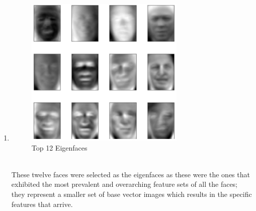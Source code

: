 \documentclass[11pt]{article}
\newcommand{\solution}[1]{{{\color{blue}{\bf Solution:} {#1}}}}
\begin{document}
\begin{enumerate}
\item
\solution{
\begin{figure}[!htbp]
    \centering
    \includegraphics[width=3in]{b.png}
    \caption{Top 12 Eigenfaces} 
\end{figure} \\
These twelve faces were selected as the eigenfaces as these were the ones that exhibited the most prevalent and overarching feature sets of all the faces; they represent a smaller set of base vector images which results in the specific features that arrive.
}


\end{enumerate}
\end{document}
